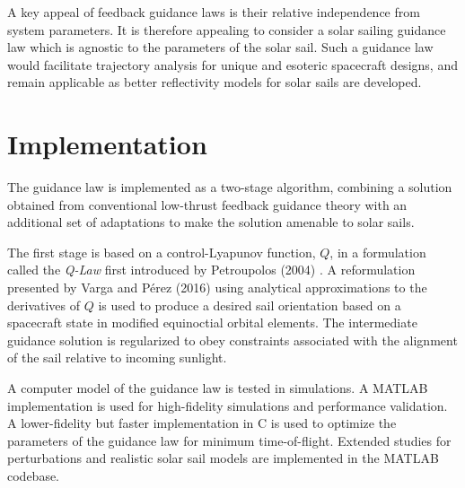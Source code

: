 A key appeal of feedback guidance laws is their relative independence from system parameters. It is therefore appealing to consider a solar sailing guidance law which is agnostic to the parameters of the solar sail. Such a guidance law would facilitate trajectory analysis for unique and esoteric spacecraft designs, and remain applicable as better reflectivity models for solar sails are developed.

\section{Implementation}
The guidance law is implemented as a two-stage algorithm, combining a solution obtained from conventional low-thrust feedback guidance theory with an additional set of adaptations to make the solution amenable to solar sails.

The first stage is based on a control-Lyapunov function, \(Q\), in a formulation called the \textit{\textit{Q-Law}} first introduced by Petroupolos (2004) \cite{petropoulos2004low}. A reformulation presented by Varga and Pérez (2016) \cite{vargaperez2016} using analytical approximations to the derivatives of \(Q\) is used to produce a desired sail orientation based on a spacecraft state in modified equinoctial orbital elements. The intermediate guidance solution is regularized to obey constraints associated with the alignment of the sail relative to incoming sunlight.

A computer model of the guidance law is tested in simulations. A MATLAB implementation is used for high-fidelity simulations and performance validation. A lower-fidelity but faster implementation in C is used to optimize the parameters of the guidance law for minimum time-of-flight. Extended studies for perturbations and realistic solar sail models are implemented in the MATLAB codebase.